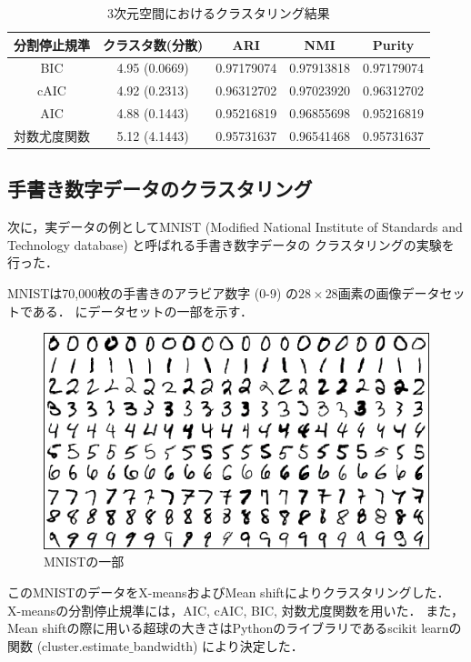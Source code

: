 \begin{table}[htb]
  \centering
  \caption{3次元空間におけるクラスタリング結果}
  \label{table:3dim}
  \begin{tabular}{|c|c|c|c|c|} \hline
    分割停止規準 & クラスタ数(分散) & ARI & NMI & Purity \\\hline
    BIC & 4.95 (0.0669) & 0.97179074 & 0.97913818 & 0.97179074\\
    cAIC & 4.92 (0.2313) & 0.96312702 & 0.97023920 & 0.96312702\\
    AIC & 4.88 (0.1443) & 0.95216819 & 0.96855698 & 0.95216819\\
    対数尤度関数 & 5.12 (4.1443) & 0.95731637 & 0.96541468 & 0.95731637\\\hline
  \end{tabular}
\end{table}

\subsection{手書き数字データのクラスタリング}

次に，実データの例としてMNIST (Modified National Institute of Standards and Technology database) と呼ばれる手書き数字データの
クラスタリングの実験を行った．

MNISTは70,000枚の手書きのアラビア数字 (0-9) の$28 \times 28$画素の画像データセットである．
にデータセットの一部を示す．

\begin{figure}[htbp]
  \begin{center}
    \includegraphics[width=0.7\linewidth]{./img/MNIST.png}
      \caption{MNISTの一部}
      \label{fig:mnist}
  \end{center}
\end{figure}

このMNISTのデータをX-meansおよびMean shiftによりクラスタリングした．
X-meansの分割停止規準には，AIC, cAIC, BIC, 対数尤度関数を用いた．
また，Mean shiftの際に用いる超球の大きさはPythonのライブラリであるscikit learnの関数
(cluster.estimate$\_$bandwidth) により決定した．

